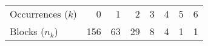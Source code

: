  \begin{center}
 \begin{tabular}{l|rrrrrrr}
  \hline
  Occurrences ($k$)   &   0 &  1 &  2 & 3 & 4 & 5 & 6 \\ 
      Blocks ($n_k$)  & 156 & 63 & 29 & 8 & 4 & 1 & 1 \\ 
  \hline
 \end{tabular}
 \end{center}
